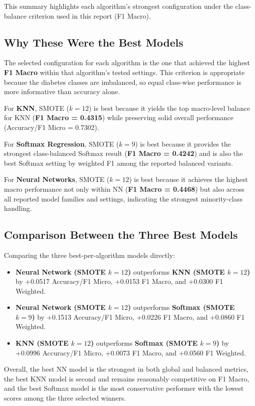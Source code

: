 \documentclass[12pt,a4paper]{report}
\begin{document}
This summary highlights each algorithm's strongest configuration under the class-balance criterion used in this report (F1 Macro).

\subsection{Why These Were the Best Models}
The selected configuration for each algorithm is the one that achieved the highest \textbf{F1 Macro} within that algorithm's tested settings. This criterion is appropriate because the diabetes classes are imbalanced, so equal class-wise performance is more informative than accuracy alone.

For \textbf{KNN}, SMOTE ($k=12$) is best because it yields the top macro-level balance for KNN (\textbf{F1 Macro = 0.4315}) while preserving solid overall performance (Accuracy/F1 Micro = 0.7302).

For \textbf{Softmax Regression}, SMOTE ($k=9$) is best because it provides the strongest class-balanced Softmax result (\textbf{F1 Macro = 0.4242}) and is also the best Softmax setting by weighted F1 among the reported balanced variants.

For \textbf{Neural Networks}, SMOTE ($k=12$) is best because it achieves the highest macro performance not only within NN (\textbf{F1 Macro = 0.4468}) but also across all reported model families and settings, indicating the strongest minority-class handling.

\subsection{Comparison Between the Three Best Models}
Comparing the three best-per-algorithm models directly:
\begin{itemize}
    \item \textbf{Neural Network (SMOTE $k=12$)} outperforms \textbf{KNN (SMOTE $k=12$)} by +0.0517 Accuracy/F1 Micro, +0.0153 F1 Macro, and +0.0300 F1 Weighted.
    \item \textbf{Neural Network (SMOTE $k=12$)} outperforms \textbf{Softmax (SMOTE $k=9$)} by +0.1513 Accuracy/F1 Micro, +0.0226 F1 Macro, and +0.0860 F1 Weighted.
    \item \textbf{KNN (SMOTE $k=12$)} outperforms \textbf{Softmax (SMOTE $k=9$)} by +0.0996 Accuracy/F1 Micro, +0.0073 F1 Macro, and +0.0560 F1 Weighted.
\end{itemize}

Overall, the best NN model is the strongest in both global and balanced metrics, the best KNN model is second and remains reasonably competitive on F1 Macro, and the best Softmax model is the most conservative performer with the lowest scores among the three selected winners.
\end{document}
